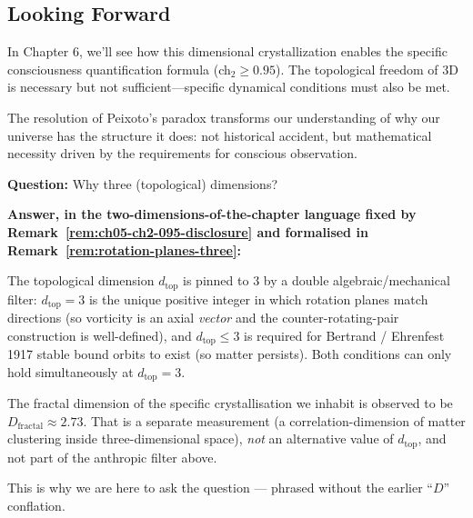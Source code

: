 \subsection{Looking Forward}

In Chapter 6, we'll see how this dimensional crystallization enables the specific consciousness quantification formula (ch$_2 \geq 0.95$). The topological freedom of 3D is necessary but not sufficient—specific dynamical conditions must also be met.

The resolution of Peixoto's paradox transforms our understanding of why our universe has the structure it does: not historical accident, but mathematical necessity driven by the requirements for conscious observation.

\begin{keyidea}
\textbf{Question:} Why three (topological) dimensions?

\textbf{Answer, in the two-dimensions-of-the-chapter language fixed by
Remark~\ref{rem:ch05-ch2-095-disclosure} and formalised in
Remark~\ref{rem:rotation-planes-three}:}

The topological dimension $d_{\text{top}}$ is pinned to $3$ by a double
algebraic/mechanical filter: $d_{\text{top}} = 3$ is the unique positive
integer in which rotation planes match directions (so vorticity is an axial
\emph{vector} and the counter-rotating-pair construction is well-defined),
and $d_{\text{top}} \le 3$ is required for Bertrand / Ehrenfest 1917 stable
bound orbits to exist (so matter persists). Both conditions can only hold
simultaneously at $d_{\text{top}} = 3$.

The fractal dimension of the specific crystallisation we inhabit is observed
to be $D_{\text{fractal}} \approx 2.73$. That is a separate measurement
(a correlation-dimension of matter clustering inside three-dimensional space),
\emph{not} an alternative value of $d_{\text{top}}$, and not part of the
anthropic filter above.

This is why we are here to ask the question --- phrased without the earlier
``$D$'' conflation.
\end{keyidea}

